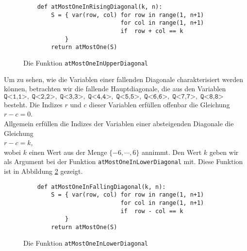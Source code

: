 \begin{figure}[!ht]
  \centering
\begin{verbatim}
    def atMostOneInRisingDiagonal(k, n):
        S = { var(row, col) for row in range(1, n+1)
                            for col in range(1, n+1) 
                            if  row + col == k 
            }
        return atMostOne(S)
\end{verbatim}
\vspace*{-0.3cm}
  \caption{Die Funktion \texttt{atMostOneInUpperDiagonal}}
  \label{fig:atMostOneInUpperDiagonal}
\end{figure}

Um zu sehen, wie die Variablen einer fallenden Diagonale
charakterisiert werden können, betrachten wir die fallende Hauptdiagonale, die aus den
Variablen \\[0.2cm]
\hspace*{1.3cm} 
$\texttt{Q<1,1>},\; \texttt{Q<2,2>},\; \texttt{Q<3,3>},\; \texttt{Q<4,4>},\; \texttt{Q<5,5>},\; 
 \texttt{Q<6,6>},\; \texttt{Q<7,7>},\; \texttt{Q<8,8>}$ 
\\[0.2cm]
besteht. Die Indizes  $r$ und $c$ dieser Variablen erfüllen offenbar
die Gleichung \\[0.2cm]
\hspace*{1.3cm} $r - c = 0$. \\[0.2cm]
Allgemein erfüllen die Indizes der Variablen einer absteigenden Diagonale die Gleichung \\[0.2cm]
\hspace*{1.3cm} $r - c = k$, \\[0.2cm]
wobei $k$ einen Wert aus der Menge $\{-6, \cdots, 6 \}$ annimmt.  Den Wert $k$ geben wir als Argument bei der
Funktion \texttt{atMostOneInLowerDiagonal} mit. Diese Funktion ist in Abbildung
\ref{fig:atMostOneInLowerDiagonal} gezeigt. 

\begin{figure}[!ht]
  \centering
\begin{verbatim}
    def atMostOneInFallingDiagonal(k, n):
        S = { var(row, col) for row in range(1, n+1)
                            for col in range(1, n+1) 
                            if  row - col == k 
            }
        return atMostOne(S)
\end{verbatim}
\vspace*{-0.3cm}
  \caption{Die Funktion \texttt{atMostOneInLowerDiagonal}}
  \label{fig:atMostOneInLowerDiagonal}
\end{figure}

